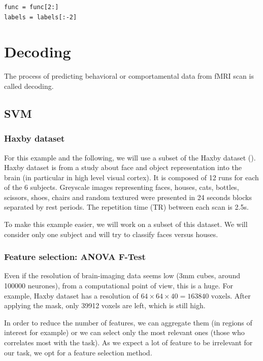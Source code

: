 \documentclass{frontiersSCNS} %
\begin{document}
\begin{lstlisting}
func = func[2:]
labels = labels[:-2]
\end{lstlisting}

\section{Decoding}

The process of predicting behavioral or comportamental data from fMRI scan is
called decoding.


\subsection{SVM}



\subsubsection{Haxby dataset}

For this example and the following, we will use a subset of the Haxby dataset
(\cite{haxby2001}).
Haxby dataset is from a study about face and object representation into the
brain (in particular in high level visual cortex). It is composed of 12 runs for
each of the 6 subjects. Greyscale images representing faces, houses, cats,
bottles, scissors, shoes, chairs and random textured were presented in 24
seconds blocks separated by rest periods. The repetition time (TR) between each
scan is 2.5s.

To make this example easier, we will work on a subset of this dataset. We will
consider only one subject and will try to classify faces versus houses.

\subsubsection{Feature selection: ANOVA F-Test}

Even if the resolution of brain-imaging data seems low (3mm cubes, around 100000
neurones), from a computational point of view, this is a huge. For example,
Haxby dataset has a resolution of $64\times64\times40 = 163840\text{ voxels}$.
After applying the mask, only 39912 voxels are left, which is still high.

In order to reduce the number of features, we can aggregate them (in regions of
interest for example) or we can select only the most relevant ones (those who
correlates most with the task). As we expect a lot of feature to be irrelevant
for our task, we opt for a feature selection method.
\end{document}
